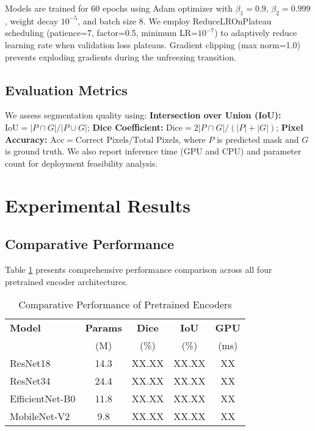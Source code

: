 \documentclass{article}
\begin{document}
Models are trained for 60 epochs using Adam optimizer with $\beta_1=0.9$, $\beta_2=0.999$, weight decay $10^{-5}$, and batch size 8. We employ ReduceLROnPlateau scheduling (patience=7, factor=0.5, minimum LR=$10^{-7}$) to adaptively reduce learning rate when validation loss plateaus. Gradient clipping (max norm=1.0) prevents exploding gradients during the unfreezing transition.

\subsection{Evaluation Metrics}

We assess segmentation quality using: \textbf{Intersection over Union (IoU):} $\text{IoU} = |P \cap G|/|P \cup G|$; \textbf{Dice Coefficient:} $\text{Dice} = 2|P \cap G|/(|P| + |G|)$; \textbf{Pixel Accuracy:} $\text{Acc} = \text{Correct Pixels}/\text{Total Pixels}$, where $P$ is predicted mask and $G$ is ground truth. We also report inference time (GPU and CPU) and parameter count for deployment feasibility analysis.

\section{Experimental Results}

\subsection{Comparative Performance}

Table \ref{tab:model_comparison} presents comprehensive performance comparison across all four pretrained encoder architectures.

\begin{table}[t]
\centering
\caption{Comparative Performance of Pretrained Encoders}
\label{tab:model_comparison}
\begin{tabular}{@{}lcccc@{}}
\toprule
\textbf{Model} & \textbf{Params} & \textbf{Dice} & \textbf{IoU} & \textbf{GPU} \\
 & (M) & (\%) & (\%) & (ms) \\
\midrule
ResNet18 & 14.3 & XX.XX & XX.XX & XX \\
ResNet34 & 24.4 & XX.XX & XX.XX & XX \\
EfficientNet-B0 & 11.8 & XX.XX & XX.XX & XX \\
MobileNet-V2 & 9.8 & XX.XX & XX.XX & XX \\
\bottomrule
\end{tabular}
\end{table}
\end{document}

